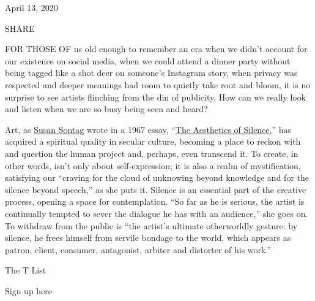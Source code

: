 April 13, 2020

SHARE

FOR THOSE OF us old enough to remember an era when we didn't account for
our existence on social media, when we could attend a dinner party
without being tagged like a shot deer on someone's Instagram story, when
privacy was respected and deeper meanings had room to quietly take root
and bloom, it is no surprise to see artists flinching from the din of
publicity. How can we really look and listen when we are so busy being
seen and heard?

Art, as \href{https://www.nytimes.com/topic/person/susan-sontag}{Susan
Sontag} wrote in a 1967 essay,
``\href{http://www.susansontag.com/SusanSontag/books/stylesOfRadicalWillExerpt.shtml}{The
Aesthetics of Silence},'' has acquired a spiritual quality in secular
culture, becoming a place to reckon with and question the human project
and, perhaps, even transcend it. To create, in other words, isn't only
about self-expression; it is also a realm of mystification, satisfying
our ``craving for the cloud of unknowing beyond knowledge and for the
silence beyond speech,'' as she puts it. Silence is an essential part of
the creative process, opening a space for contemplation. ``So far as he
is serious, the artist is continually tempted to sever the dialogue he
has with an audience,'' she goes on. To withdraw from the public is
``the artist's ultimate otherworldly gesture: by silence, he frees
himself from servile bondage to the world, which appears as patron,
client, consumer, antagonist, arbiter and distorter of his work.''

The T List \textbar{}

Sign up here

